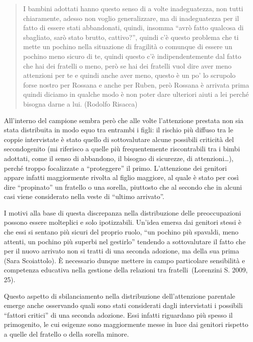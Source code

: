 \documentclass[12pt,oneside,svgnames]{memoir}
\newenvironment{quotationb}%
{\color{maincolor}\begin{leftbar}\begin{quotation}}%
{\end{quotation}\end{leftbar}\ignorespacesafterend}
\begin{document}
\begin{quotationb}
I bambini adottati hanno questo senso di a volte inadeguatezza, non
tutti chiaramente, adesso non voglio generalizzare, ma di inadeguatezza
per il fatto di essere stati abbandonati, quindi, insomma ``avrò fatto
qualcosa di sbagliato, sarò stato brutto, cattivo?'', quindi c'è questo
problema che ti mette un pochino nella situazione di fragilità o
comunque di essere un pochino meno sicuro di te, quindi questo c'è
indipendentemente dal fatto che hai dei fratelli o meno, però se hai dei
fratelli vuol dire aver meno attenzioni per te e quindi anche aver meno,
questo è un po' lo scrupolo forse nostro per Rossana e anche per Ruben,
però Rossana è arrivata prima quindi diciamo in qualche modo è non poter
dare ulteriori aiuti a lei perché bisogna darne a lui. (Rodolfo Risacca)
\end{quotationb}

All'interno del campione sembra però che alle volte l'attenzione
prestata non sia stata distribuita in modo equo tra entrambi i figli: il
rischio più diffuso tra le coppie intervistate è stato quello di
sottovalutare alcune possibili criticità del secondogenito (mi riferisco
a quelle più frequentemente riscontrabili tra i bimbi adottati, come il
senso di abbandono, il bisogno di sicurezze, di attenzioni\ldots{}),
perché troppo focalizzate a ``proteggere'' il primo. L'attenzione dei
genitori appare infatti maggiormente rivolta al figlio maggiore, al
quale è stato per così dire ``propinato'' un fratello o una sorella,
piuttosto che al secondo che in alcuni casi viene considerato nella
veste di ``ultimo arrivato''.

I motivi alla base di questa discrepanza nella distribuzione delle
preoccupazioni possono essere molteplici e solo ipotizzabili. Un'idea
emersa dai genitori stessi è che essi si sentano più sicuri del proprio
ruolo, ``un pochino più spavaldi, meno attenti, un pochino più superbi
nel gestirlo'' tendendo a sottovalutare il fatto che per il nuovo
arrivato non si tratti di una seconda adozione, ma della sua prima (Sara
Scoiattolo). È necessario dunque mettere in campo particolare
sensibilità e competenza educativa nella gestione della relazioni tra
fratelli~(Lorenzini S. 2009, 25).

Questo aspetto di sbilanciamento nella distribuzione dell'attenzione
parentale emerge anche osservando quali sono stati considerati dagli
intervistati i possibili ``fattori critici'' di una seconda adozione.
Essi infatti riguardano più spesso il primogenito, le cui esigenze sono
maggiormente messe in luce dai genitori rispetto a quelle del fratello o
della sorella minore.
\end{document}
